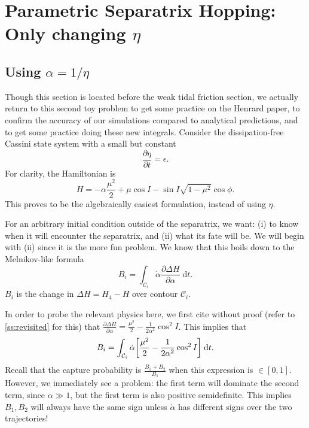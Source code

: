 \documentclass[11pt,
        usenames, %
        dvipsnames %
    ]{article}
\newcommand*{\pd}[2]{\frac{\partial#1}{\partial#2}}
\DeclarePairedDelimiter\s{\lbrack}{\rbrack}
\begin{document}
\section{Parametric Separatrix Hopping: Only changing $\eta$}\label{s:p2}

\subsection{Using $\alpha = 1/\eta$}

Though this section is located before the weak tidal friction section, we
actually return to this second toy problem to get some practice on the Henrard
paper, to confirm the accuracy of our simulations compared to analytical
predictions, and to get some practice doing these new integrals. Consider the
dissipation-free Cassini state system with a small but constant
\begin{equation}
    \pd{\eta}{t} = \epsilon.\label{eq:p2_eom}
\end{equation}
For clarity, the Hamiltonian is
\begin{equation}
    H = -\alpha\frac{\mu^2}{2} +
        \mu \cos I - \sin I \sqrt{1 - \mu^2} \cos \phi.
\end{equation}
This proves to be the algebraically easiest formulation, instead of using
$\eta$.

For an arbitrary initial condition outside of the separatrix, we want: (i) to
know when it will encounter the separatrix, and (ii) what its fate will be. We
will begin with (ii) since it is the more fun problem. We know that this boils
down to the Melnikov-like formula
\begin{equation}
    B_i = \int_{\mathcal{C}_i} \dot{\alpha}\pd{\Delta H}{\alpha}
        \;\mathrm{d}t.
\end{equation}
$B_i$ is the change in $\Delta H = H_4 - H$ over contour $\mathcal{C}_i$.

In order to probe the relevant physics here, we first cite without proof (refer
to \autoref{ss:revisited} for this) that $\pd{\Delta H}{\alpha} =
\frac{\mu^2}{2} - \frac{1}{2\alpha^2}\cos^2 I$. This implies that
\begin{equation}
    B_i = \int_{\mathcal{C}_i} \dot{\alpha}\s*{
        \frac{\mu^2}{2} - \frac{1}{2\alpha^2}\cos^2 I}
        \;\mathrm{d}t.
\end{equation}
Recall that the capture probability is $\frac{B_1 + B_2}{B_1}$ when this
expression is $\in [0, 1]$. However, we immediately see a problem: the first
term will dominate the second term, since $\alpha \gg 1$, but the first term is
also positive semidefinite. This implies $B_1, B_2$ will always have the same
sign unless $\dot{\alpha}$ has different signs over the two trajectories!
\end{document}
